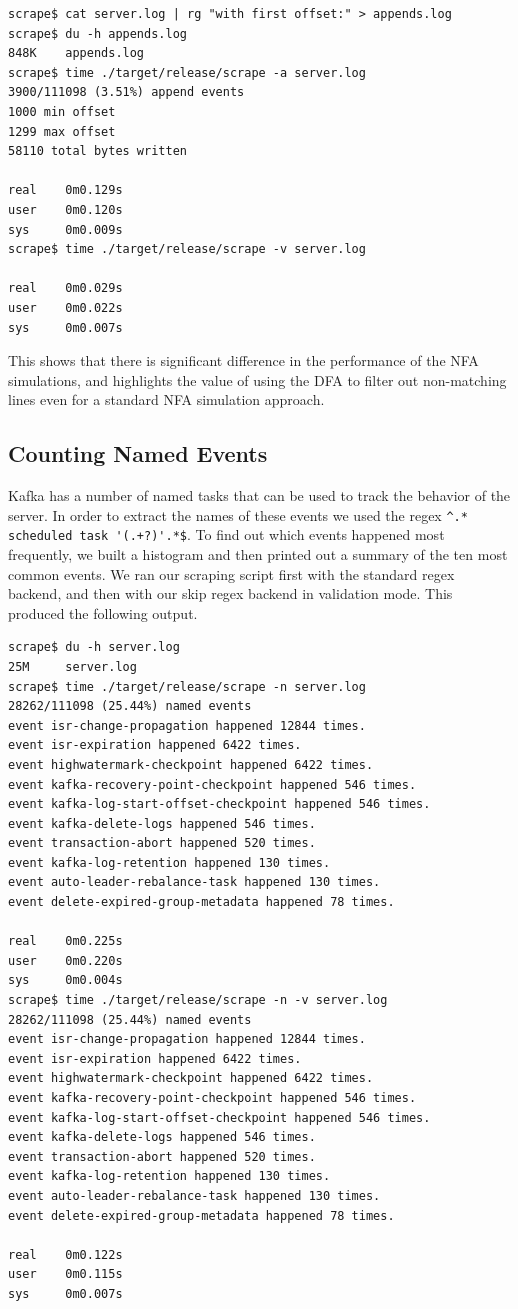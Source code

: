 \begin{verbatim}
scrape$ cat server.log | rg "with first offset:" > appends.log 
scrape$ du -h appends.log 
848K    appends.log
scrape$ time ./target/release/scrape -a server.log 
3900/111098 (3.51%) append events
1000 min offset
1299 max offset
58110 total bytes written

real    0m0.129s
user    0m0.120s
sys     0m0.009s
scrape$ time ./target/release/scrape -v server.log 

real    0m0.029s
user    0m0.022s
sys     0m0.007s
\end{verbatim}

This shows that there is significant difference in the performance
of the NFA simulations, and highlights the value of using the DFA
to filter out non-matching lines even for a standard NFA simulation
approach.

\subsection{Counting Named Events}

Kafka has a number of named tasks that can be used to track
the behavior of the server. In order to extract the names
of these events we used the regex \verb|^.* scheduled task '(.+?)'.*$|.
To find out which events happened most frequently, we built
a histogram and then printed out a summary of the ten most
common events. We ran our scraping script first with the standard regex
backend, and then with our skip regex backend in validation
mode. This produced the following output.

\begin{verbatim}
scrape$ du -h server.log 
25M     server.log
scrape$ time ./target/release/scrape -n server.log 
28262/111098 (25.44%) named events
event isr-change-propagation happened 12844 times.
event isr-expiration happened 6422 times.
event highwatermark-checkpoint happened 6422 times.
event kafka-recovery-point-checkpoint happened 546 times.
event kafka-log-start-offset-checkpoint happened 546 times.
event kafka-delete-logs happened 546 times.
event transaction-abort happened 520 times.
event kafka-log-retention happened 130 times.
event auto-leader-rebalance-task happened 130 times.
event delete-expired-group-metadata happened 78 times.

real    0m0.225s
user    0m0.220s
sys     0m0.004s
scrape$ time ./target/release/scrape -n -v server.log 
28262/111098 (25.44%) named events
event isr-change-propagation happened 12844 times.
event isr-expiration happened 6422 times.
event highwatermark-checkpoint happened 6422 times.
event kafka-recovery-point-checkpoint happened 546 times.
event kafka-log-start-offset-checkpoint happened 546 times.
event kafka-delete-logs happened 546 times.
event transaction-abort happened 520 times.
event kafka-log-retention happened 130 times.
event auto-leader-rebalance-task happened 130 times.
event delete-expired-group-metadata happened 78 times.

real    0m0.122s
user    0m0.115s
sys     0m0.007s
\end{verbatim}


